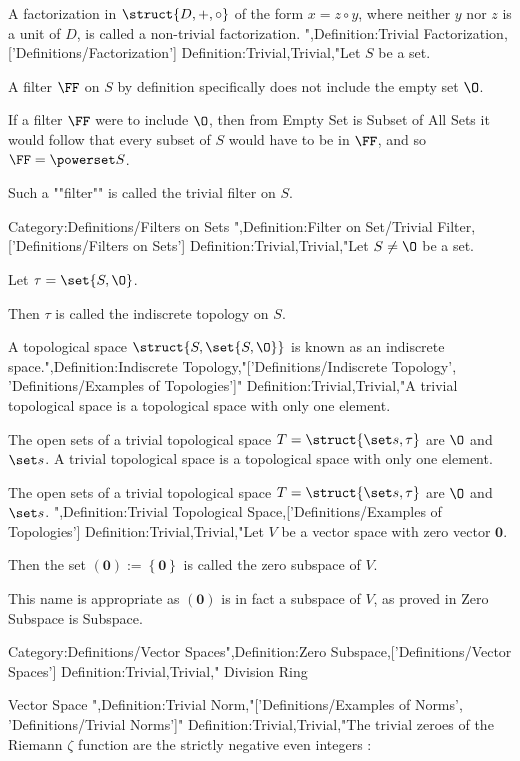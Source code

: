 A factorization in $\struct {D, +, \circ}$ of the form $x = z \circ y$, where neither $y$ nor $z$ is a unit of $D$, is called a non-trivial factorization.
",Definition:Trivial Factorization,['Definitions/Factorization']
Definition:Trivial,Trivial,"Let $S$ be a set.


A filter $\FF$ on $S$ by definition specifically does not include the empty set $\O$.

If a filter $\FF$ were to include $\O$, then from Empty Set is Subset of All Sets it would follow that every subset of $S$ would have to be in $\FF$, and so $\FF = \powerset S$.


Such a ""filter"" is called the trivial filter on $S$.


Category:Definitions/Filters on Sets
",Definition:Filter on Set/Trivial Filter,['Definitions/Filters on Sets']
Definition:Trivial,Trivial,"Let $S \ne \O$ be a set.

Let $\tau = \set {S, \O}$.


Then $\tau$ is called the indiscrete topology on $S$.


A topological space $\struct {S, \set {S, \O} }$ is known as an indiscrete space.",Definition:Indiscrete Topology,"['Definitions/Indiscrete Topology', 'Definitions/Examples of Topologies']"
Definition:Trivial,Trivial,"A trivial topological space is a topological space with only one element.


The open sets of a trivial topological space $T = \struct {\set s, \tau}$ are $\O$ and $\set s$.
A trivial topological space is a topological space with only one element.


The open sets of a trivial topological space $T = \struct {\set s, \tau}$ are $\O$ and $\set s$.
",Definition:Trivial Topological Space,['Definitions/Examples of Topologies']
Definition:Trivial,Trivial,"Let $V$ be a vector space with zero vector $\mathbf 0$.


Then the set $(\mathbf 0) := \left\{{\mathbf 0}\right\}$ is called the zero subspace of $V$.


This name is appropriate as $(\mathbf 0)$ is in fact a subspace of $V$, as proved in Zero Subspace is Subspace.




Category:Definitions/Vector Spaces",Definition:Zero Subspace,['Definitions/Vector Spaces']
Definition:Trivial,Trivial," Division Ring 


 Vector Space 
",Definition:Trivial Norm,"['Definitions/Examples of Norms', 'Definitions/Trivial Norms']"
Definition:Trivial,Trivial,"The trivial zeroes of the Riemann $\zeta$ function are the strictly negative even integers :

